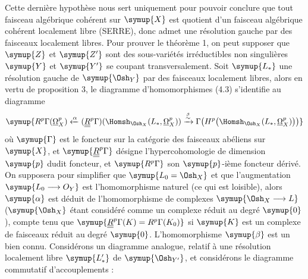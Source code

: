 Cette dernière hypothèse nous sert uniquement pour pouvoir conclure que tout
faisceau algébrique cohérent sur $\symup{X}$ est quotient d'un faisceau algébrique
cohérent localement libre (SERRE), donc admet une résolution gauche par des
faisceaux localement libres. Pour prouver le théorème 1, on peut supposer que
$\symup{Z}$ et $\symup{Z'}$ sont des sous-variétés irréductibles non singulières $\symup{Y}$ et $\symup{Y'}$ se
coupant transversalement. Soit $\symup{L_{*}}$ une résolution gauche de $\symup{\Osh_Y}$ par des
faisceaux localement libres, alors en vertu de proposition 3, le diagramme
d'homomorphismes (4.3) s'identifie au diagramme
\[
\symup{R^{p}\Gamma(\underline{\Omega}_X^{p})
\xleftarrow{\alpha}
(\underline{\underline{R}}^{p}\Gamma)\!\left(\Homsh_{\Osh_X}(L_{*},\underline{\Omega}_X^{p})\right)
\xrightarrow{\overset{\beta}{\sim}}
\Gamma\!\left(H^{p}\bigl(\Homsh_{\Osh_X}(L_{*},\underline{\Omega}_X^{p})\bigr)\right)}
\]
où $\symup{\Gamma}$ est le foncteur  sur la catégorie des
faisceaux abéliens sur $\symup{X}$, et $\symup{\underline{\underline{R}}^{p}\Gamma}$ désigne
l'hypercohomologie de dimension $\symup{p}$ dudit foncteur, et $\symup{R^{p}\Gamma}$ son
$\symup{p}$-ième foncteur dérivé. On supposera pour simplifier que $\symup{L_0=\Osh_X}$ et que
l'augmentation $\symup{L_0\longrightarrow O_Y}$ est l'homomorphisme naturel (ce qui
est loisible), alors $\symup{\alpha}$ est déduit de l'homomorphisme de complexes
$\symup{\Osh_X\longrightarrow L}$ ($\symup{\Osh_X}$ étant considéré comme un complexe réduit
au degré $\symup{0}$), compte tenu que $\symup{\underline{\underline{R}}^{p}\Gamma(K)=R^{p}\Gamma(K_0)}$ si $\symup{K}$
est un complexe de faisceaux réduit au degré $\symup{0}$. L'homomorphisme $\symup{\beta}$ est un
 bien connu. Considérons un diagramme analogue, relatif à
une résolution localement libre $\symup{L'_{*}}$ de $\symup{\Osh_{Y'}}$, et considérons le
diagramme commutatif d'accouplements :

